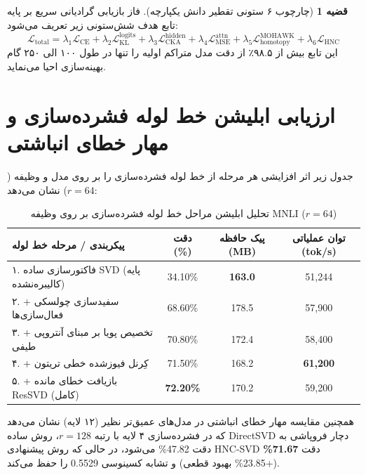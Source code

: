 \documentclass[12pt,a4paper]{report}
\theoremstyle{definition}
\newtheorem{theorem}{قضیه}[chapter]
\begin{document}
\begin{theorem}[چارچوب ۶ ستونی تقطیر دانش یکپارچه]
\label{thm:six_pillar_kd_summary}
فاز بازیابی گرادیانی سریع بر پایه تابع هدف شش‌ستونی زیر تعریف می‌شود:
\begin{equation}
\mathcal{L}_{\text{total}} = \lambda_1 \mathcal{L}_{\text{CE}} + \lambda_2 \mathcal{L}_{\text{KL}}^{\text{logits}} + \lambda_3 \mathcal{L}_{\text{CKA}}^{\text{hidden}} + \lambda_4 \mathcal{L}_{\text{MSE}}^{\text{attn}} + \lambda_5 \mathcal{L}_{\text{homotopy}}^{\text{MOHAWK}} + \lambda_6 \mathcal{L}_{\text{HNC}}
\end{equation}
این تابع بیش از ۹۸.۵٪ از دقت مدل متراکم اولیه را تنها در طول ۱۰۰ الی ۲۵۰ گام بهینه‌سازی احیا می‌نماید.
\end{theorem}

\section{ارزیابی ابلیشن خط لوله فشرده‌سازی و مهار خطای انباشتی}
جدول زیر اثر افزایشی هر مرحله از خط لوله فشرده‌سازی را بر روی مدل  و وظیفه  ($r=64$) نشان می‌دهد:

\begin{table}[H]
\centering
\caption{تحلیل ابلیشن مراحل خط لوله فشرده‌سازی بر روی وظیفه MNLI ($r=64$)}
\label{tab:ablation_summary}
\begin{tabular}{lccc}
\toprule
\textbf{پیکربندی / مرحله خط لوله} & \textbf{دقت (\%)} & \textbf{پیک حافظه (MB)} & \textbf{توان عملیاتی (tok/s)} \\
\midrule
۱. فاکتورسازی ساده SVD (پایه کالیبره‌نشده) & 34.10\% & \textbf{163.0} & 51,244 \\
۲. + سفیدسازی چولسکی فعال‌سازی‌ها & 68.60\% & 178.5 & 57,900 \\
۳. + تخصیص پویا بر مبنای آنتروپی طیفی & 70.80\% & 172.4 & 58,400 \\
۴. + کِرنل فیوزشده خطی تریتون & 71.50\% & 168.2 & \textbf{61,200} \\
۵. + بازیافت خطای مانده ResSVD (کامل) & \textbf{72.20\%} & 170.2 & 59,200 \\
\bottomrule
\end{tabular}
\end{table}

همچنین مقایسه مهار خطای انباشتی در مدل‌های عمیق‌تر نظیر  (۱۲ لایه) نشان می‌دهد که در فشرده‌سازی ۴ لایه با رتبه $r=128$، روش ساده DirectSVD دچار فروپاشی به دقت 47.82\% می‌شود، در حالی که روش پیشنهادی HNC-SVD دقت \textbf{71.67\%} (+23.85\% بهبود قطعی) و تشابه کسینوسی 0.5529 را حفظ می‌کند.
\end{document}
